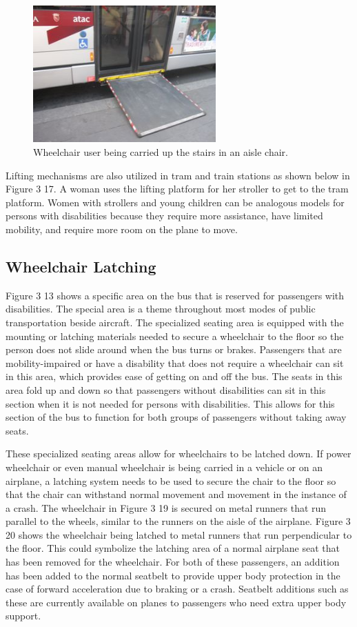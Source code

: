\documentclass[a4paper, 12pt,conference]{new_cit_thesis}
\begin{document}
\begin{figure}[h]
  \centering
     \includegraphics[width=7cm]{images/image041}
   \caption{Wheelchair user being carried up the stairs in an aisle chair.}%
  \label{fig:41}
\end{figure}

Lifting mechanisms are also utilized in tram and train stations as shown below in Figure 3 17.   A woman uses the lifting platform for her stroller to get to the tram platform. Women with strollers and young children can be analogous models for persons with disabilities because they require more assistance, have limited mobility, and require more room on the plane to move. 

\subsection{Wheelchair Latching}
Figure 3 13 shows a specific area on the bus that is reserved for passengers with disabilities.  The special area is a theme throughout most modes of public transportation beside aircraft.  The specialized seating area is equipped with the mounting or latching materials needed to secure a wheelchair to the floor so the person does not slide around when the bus turns or brakes. Passengers that are mobility-impaired or have a disability that does not require a wheelchair can sit in this area, which provides ease of getting on and off the bus. The seats in this area fold up and down so that passengers without disabilities can sit in this section when it is not needed for persons with disabilities.  This allows for this section of the bus to function for both groups of passengers without taking away seats.

These specialized seating areas allow for wheelchairs to be latched down. If power wheelchair or even manual wheelchair is being carried in a vehicle or on an airplane, a latching system needs to be used to secure the chair to the floor so that the chair can withstand normal movement and movement in the instance of a crash. The wheelchair in Figure 3 19 is secured on metal runners that run parallel to the wheels, similar to the runners on the aisle of the airplane.  Figure 3 20 shows the wheelchair being latched to metal runners that run perpendicular to the floor.  This could symbolize the latching area of a normal airplane seat that has been removed for the wheelchair. For both of these passengers, an addition has been added to the normal seatbelt to provide upper body protection in the case of forward acceleration due to braking or a crash. Seatbelt additions such as these are currently available on planes to passengers who need extra upper body support.
\end{document}
